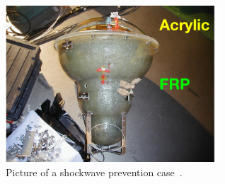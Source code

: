 \begin{figure}[tbp]
	\centering
	\includegraphics[width=8cm]{Figures/SK/Case}
	\caption[Picture of a shockwave prevention case]{
	Picture of a shockwave prevention case~\cite{SKaccident}.
	}\label{SK_Case}
\end{figure}

